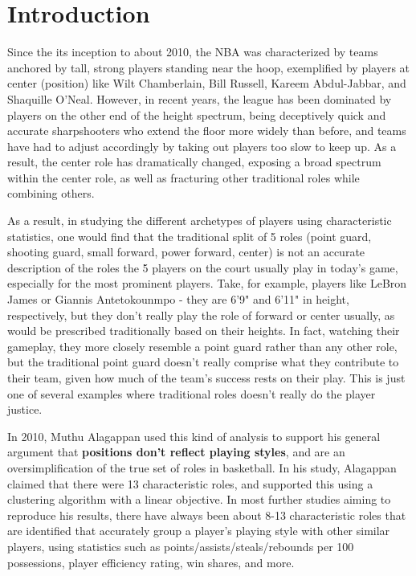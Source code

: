 \documentclass[12pt]{article}
\begin{document}
    \setlength{\parindent}{0in}
    \addtolength{\parskip}{0.1cm}
    \setlength{\fboxrule}{.5mm}\setlength{\fboxsep}{1.2mm}
    \newlength{\boxlength}\setlength{\boxlength}{\textwidth}
    \addtolength{\boxlength}{-4mm}
    \begin{center}
    \end{center}
    \vspace{5mm}
    \section{Introduction}
    Since the its inception to about 2010, the NBA was characterized by teams anchored by tall, strong players standing near the hoop, exemplified by players at center (position) like Wilt Chamberlain, Bill Russell, Kareem Abdul-Jabbar, and Shaquille O'Neal. However, in recent years, the league has been dominated by players on the other end of the height spectrum, being deceptively quick and accurate sharpshooters who extend the floor more widely than before, and teams have had to adjust accordingly by taking out players too slow to keep up. As a result, the center role has dramatically changed, exposing a broad spectrum within the center role, as well as fracturing other traditional roles while combining others.

    As a result, in studying the different archetypes of players using characteristic statistics,  one would find that the traditional split of 5 roles (point guard, shooting guard, small forward, power forward, center) is not an accurate description of the roles the 5 players on the court usually play in today's game, especially for the most prominent players. Take, for example, players like LeBron James or Giannis Antetokounmpo - they are 6'9" and 6'11" in height, respectively, but they don't really play the role of forward or center usually, as would be prescribed traditionally based on their heights. In fact, watching their gameplay, they more closely resemble a point guard rather than any other role, but the traditional point guard doesn't really comprise what they contribute to their team, given how much of the team's success rests on their play. This is just one of several examples where traditional roles doesn't really do the player justice.
    
    In 2010, Muthu Alagappan used this kind of analysis to support his general argument that \textbf{positions don't reflect playing styles}, and are an oversimplification of the true set of roles in basketball. In his study, Alagappan claimed that there were 13 characteristic roles, and supported this using a clustering algorithm with a linear objective. In most further studies aiming to reproduce his results, there have always been about 8-13 characteristic roles that are identified that accurately group a player's playing style with other similar players, using statistics such as points/assists/steals/rebounds per 100 possessions, player efficiency rating, win shares, and more.
    
\end{document}
